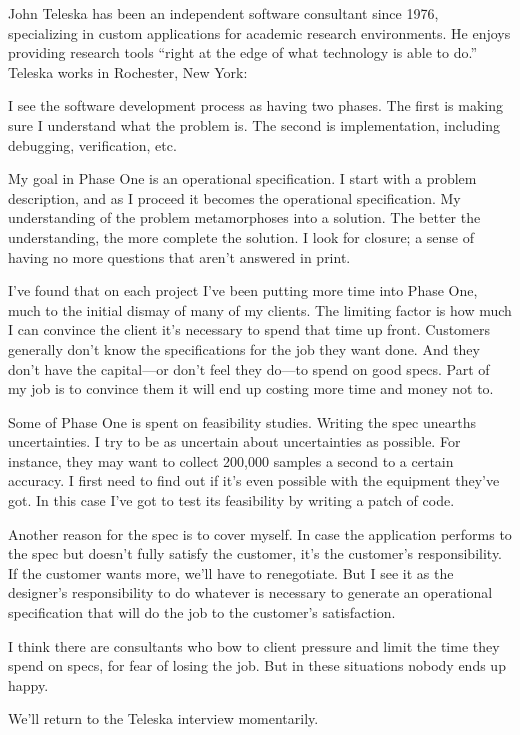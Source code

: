 \begin{interview}
\noindent John Teleska has been an independent software consultant
since 1976, specializing in custom applications for academic research
environments.  He enjoys providing research tools ``right at the edge
of what technology is able to do.'' Teleska works in Rochester, New York:

\begin{tfquot}
I see the software development process as having two phases. The first is
making sure I understand what the problem is. The second is
implementation, including debugging, verification, etc.

My goal in Phase One is an operational specification. I start with a
problem description, and as I proceed it becomes the operational
specification. My understanding of the problem metamorphoses into a
solution. The better the understanding, the more complete the
solution. I look for closure; a sense of having no more questions that
aren't answered in print.

I've found that on each project I've been putting more time into Phase
One, much to the initial dismay of many of my clients. The limiting
factor is how
much I can convince the client it's necessary to spend that time up
front.  Customers generally don't know the specifications for the job
they want done. And they don't have the capital---or don't feel they
do---to spend on good specs. Part of my job is to convince them it
will end up costing more time and money not to.

Some of Phase One is spent on feasibility studies. Writing the spec
unearths uncertainties. I try to be as uncertain about uncertainties as
possible. For instance, they may want to collect 200,000 samples a second to a
certain accuracy. I first need to find out if it's even possible with the
equipment they've got. In this case I've got to test its feasibility by writing a
patch of code.

Another reason for the spec is to cover myself. In case the application
performs to the spec but doesn't fully satisfy the customer, it's the customer's
responsibility. If the customer wants more, we'll have to renegotiate. But I
see it as the designer's responsibility to do whatever is necessary to
generate an operational specification that will do the job to the customer's
satisfaction.

I think there are consultants who bow to client pressure and limit the time
they spend on specs, for fear of losing the job. But in these situations
nobody ends up happy.
\end{tfquot}
\end{interview}
We'll return to the Teleska interview momentarily.

